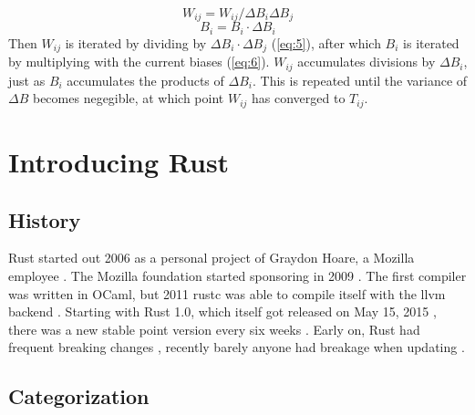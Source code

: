 \begin{equation}\label{eq:5}
    W_{ij} = W_{ij} / \Delta B_i \Delta B_j
\end{equation}
\begin{equation}\label{eq:6}
    B_i = B_i \cdot \Delta B_i
\end{equation}
Then $W_{ij}$ is iterated by dividing by $\Delta B_i \cdot \Delta B_j$
(\eqref{eq:5}), after which $B_i$ is iterated by multiplying with the current
biases (\eqref{eq:6}). $W_{ij}$ accumulates divisions by $\Delta B_i$, just as
$B_i$ accumulates the products of $\Delta B_i$. This is repeated until the
variance of $\Delta B$ becomes negegible, at which point $W_{ij}$ has converged
to $T_{ij}$.






\section{Introducing Rust}\label{sec:Rust}

\subsection{History}\label{sec:RustHistory}

Rust started out 2006 as a personal project of Graydon Hoare, a Mozilla
employee \cite{rustbegin}. The Mozilla foundation started sponsoring in 2009
\cite{rustbegin}. The first compiler was written in OCaml, but 2011 rustc was
able to compile itself with the llvm backend \cite{rustcompile}. Starting with
Rust 1.0, which itself got released on May 15, 2015 \cite{rustversions}, there
was a new stable point version every six weeks \cite{rustversions}. Early on,
Rust had frequent breaking changes \cite{rustchanges}, recently barely anyone
had breakage when updating \cite{rustupdate}.

\subsection{Categorization}\label{sec:RustCategory}

